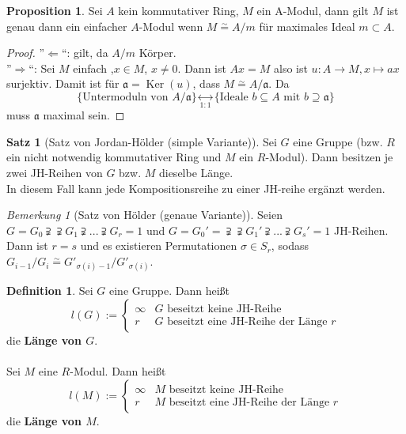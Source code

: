 \documentclass[10pt,a4paper]{article}
\newcommand{\Ker}{\ensuremath{\operatorname{Ker}}}
\newcommand{\isomorph}{\ensuremath{\overset{\sim}{=}}}
\newcounter{thm}[section]
\theoremstyle{definition}
\newtheorem{definition}[thm]{Definition}
\newtheorem{satz}[thm]{Satz}
\newtheorem{prop}[thm]{Proposition}
\theoremstyle{plain}
\theoremstyle{remark}
\newtheorem*{bem*}{Bemerkung}
\begin{document}
\begin{prop}
	Sei $A$ kein kommutativer Ring, $M$ ein A-Modul, dann gilt $M$ ist genau dann ein einfacher $A$-Modul wenn $M\isomorph A/m$ für maximales Ideal $m\subset A$.
\end{prop}

\begin{proof}
	''$\Leftarrow$``: gilt, da $A/m$ Körper.\\
	''$\Rightarrow$``: Sei $M$ einfach ,$x\in M$, $x\neq 0$. Dann ist $Ax=M$ also ist $u:A\rightarrow M,x\mapsto ax$ surjektiv. Damit ist für $\mathfrak a=\Ker(u)$, dass $M\isomorph A/\mathfrak a$. Da
	\[\{\text{Untermoduln von $A/\mathfrak a$}\}\underset{1:1}{\leftrightarrow} \{\text{Ideale $b\subseteq A$ mit $b\supseteq \mathfrak a$}\}\]
	muss $\mathfrak a$ maximal sein.
\end{proof}

\begin{satz}[Satz von Jordan-Hölder (simple Variante)]
	Sei $G$ eine Gruppe (bzw. $R$ ein nicht notwendig kommutativer Ring und $M$ ein $R$-Modul). Dann besitzen je zwei JH-Reihen von $G$ bzw. $M$ dieselbe Länge.\\
	In diesem Fall kann jede Kompositionsreihe zu einer JH-reihe ergänzt werden.
\end{satz}

\begin{bem*}[Satz von Hölder (genaue Variante)]
	Seien $G=G_0\supsetneqq\supsetneqq G_1\supsetneqq ...\supsetneqq G_r=1$ und $G=G_0'=\supsetneqq\supsetneqq G_1'\supsetneqq ...\supsetneqq G_s'=1$ JH-Reihen.\\
	Dann ist $r=s$ und es existieren Permutationen $\sigma\in S_r$, sodass $G_{i-1}/G_i\isomorph G'_{\sigma(i)-1}/G'_{\sigma(i)}$.
\end{bem*}

\begin{definition}
	Sei $G$ eine Gruppe. Dann heißt
	\[l(G):=\begin{cases}
	\infty&\text{$G$ beseitzt keine JH-Reihe}\\
	r&\text{$G$ beseitzt eine JH-Reihe der Länge $r$}
	\end{cases}\]
	die \textbf{Länge von $G$}.\\
	\\
	Sei $M$ eine $R$-Modul. Dann heißt
	\[l(M):=\begin{cases}
	\infty&\text{$M$ beseitzt keine JH-Reihe}\\
	r&\text{$M$ beseitzt eine JH-Reihe der Länge $r$}
	\end{cases}\]
	die \textbf{Länge von $M$}.
\end{definition}
\end{document}
